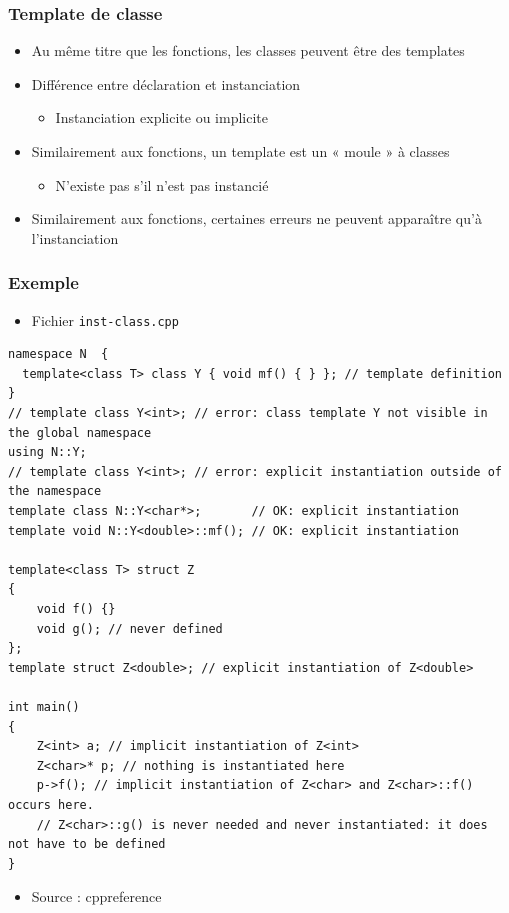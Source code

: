 \begin{frame}
\frametitle{Template de classe}
\begin{itemize}[<+->]
\item Au même titre que les fonctions, les classes peuvent être des templates
\item Différence entre déclaration et instanciation
	\begin{itemize}
	\item Instanciation explicite ou implicite
	\end{itemize}
\item Similairement aux fonctions, un template est un « moule » à classes
	\begin{itemize}
	\item N'existe pas s'il n'est pas instancié
	\end{itemize}
\item Similairement aux fonctions, certaines erreurs ne peuvent apparaître qu'à l'instanciation
\end{itemize}
\end{frame}

\begin{frame}[containsverbatim]
\frametitle{Exemple}
\begin{itemize}
\item Fichier \texttt{inst-class.cpp}
\end{itemize}
\begin{lstlisting}
namespace N  {
  template<class T> class Y { void mf() { } }; // template definition
}
// template class Y<int>; // error: class template Y not visible in the global namespace
using N::Y;
// template class Y<int>; // error: explicit instantiation outside of the namespace
template class N::Y<char*>;       // OK: explicit instantiation
template void N::Y<double>::mf(); // OK: explicit instantiation

template<class T> struct Z 
{
    void f() {}
    void g(); // never defined
};
template struct Z<double>; // explicit instantiation of Z<double>

int main()
{
	Z<int> a; // implicit instantiation of Z<int>
	Z<char>* p; // nothing is instantiated here
	p->f(); // implicit instantiation of Z<char> and Z<char>::f() occurs here.
	// Z<char>::g() is never needed and never instantiated: it does not have to be defined
}
\end{lstlisting}
\begin{itemize}
\item Source : cppreference
\end{itemize}
\end{frame}

